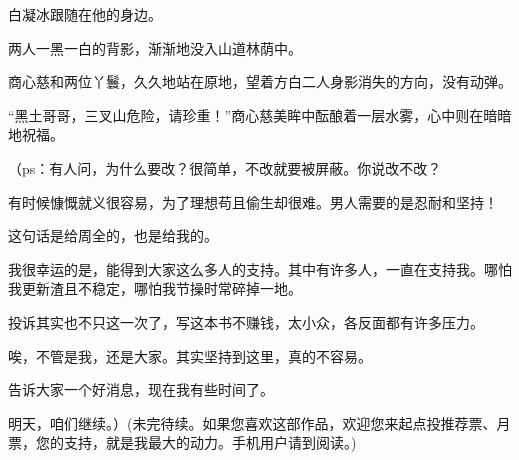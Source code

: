 \begin{this_body}
白凝冰跟随在他的身边。

两人一黑一白的背影，渐渐地没入山道林荫中。

商心慈和两位丫鬟，久久地站在原地，望着方白二人身影消失的方向，没有动弹。

“黑土哥哥，三叉山危险，请珍重！”商心慈美眸中酝酿着一层水雾，心中则在暗暗地祝福。

（ps：有人问，为什么要改？很简单，不改就要被屏蔽。你说改不改？

有时候慷慨就义很容易，为了理想苟且偷生却很难。男人需要的是忍耐和坚持！

这句话是给周全的，也是给我的。

我很幸运的是，能得到大家这么多人的支持。其中有许多人，一直在支持我。哪怕我更新渣且不稳定，哪怕我节操时常碎掉一地。

投诉其实也不只这一次了，写这本书不赚钱，太小众，各反面都有许多压力。

唉，不管是我，还是大家。其实坚持到这里，真的不容易。

告诉大家一个好消息，现在我有些时间了。

明天，咱们继续。）(未完待续。如果您喜欢这部作品，欢迎您来起点投推荐票、月票，您的支持，就是我最大的动力。手机用户请到阅读。)

\end{this_body}

